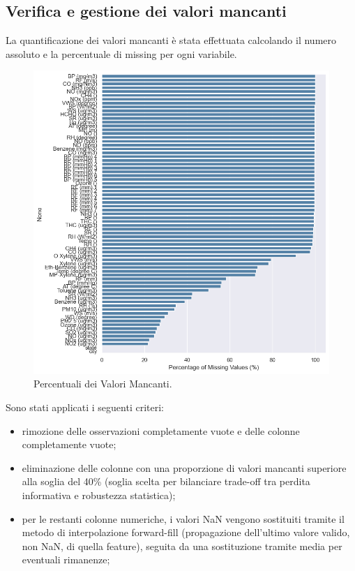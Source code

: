 \documentclass[a4paper,12pt]{report}
\begin{document}
	\subsection{Verifica e gestione dei valori mancanti}
	La quantificazione dei valori mancanti \`e stata effettuata calcolando il numero assoluto e la percentuale di missing per ogni variabile. 
	
	\begin{figure}[H]
		\centering
		\includegraphics[width=1.0\textwidth]{img/miss_value_pm.png}
		\caption{Percentuali dei Valori Mancanti.}
	\end{figure}
	
	Sono stati applicati i seguenti criteri:
	\begin{itemize}
		\item rimozione delle osservazioni completamente vuote e delle colonne completamente vuote;
		\item eliminazione delle colonne con una proporzione di valori mancanti superiore alla soglia del 40\% (soglia scelta per bilanciare trade-off tra perdita informativa e robustezza statistica);
		\item per le restanti colonne numeriche, i valori NaN vengono sostituiti tramite il metodo di interpolazione forward-fill (propagazione dell'ultimo valore valido, non NaN, di quella feature), seguita da una sostituzione tramite media per eventuali rimanenze;
	\end{itemize}
	
\end{document}
